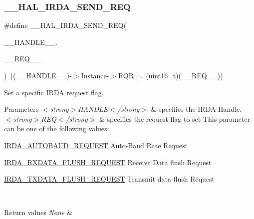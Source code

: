 \subsubsection{\texorpdfstring{\+\_\+\+\_\+\+H\+A\+L\+\_\+\+I\+R\+D\+A\+\_\+\+S\+E\+N\+D\+\_\+\+R\+EQ}{\_\_HAL\_IRDA\_SEND\_REQ}}
{\footnotesize\ttfamily \#define \+\_\+\+\_\+\+H\+A\+L\+\_\+\+I\+R\+D\+A\+\_\+\+S\+E\+N\+D\+\_\+\+R\+EQ(\begin{DoxyParamCaption}\item[{}]{\+\_\+\+\_\+\+H\+A\+N\+D\+L\+E\+\_\+\+\_\+,  }\item[{}]{\+\_\+\+\_\+\+R\+E\+Q\+\_\+\+\_\+ }\end{DoxyParamCaption})~((\+\_\+\+\_\+\+H\+A\+N\+D\+L\+E\+\_\+\+\_\+)-\/$>$Instance-\/$>$R\+QR $\vert$= (uint16\+\_\+t)(\+\_\+\+\_\+\+R\+E\+Q\+\_\+\+\_\+))}



Set a specific I\+R\+DA request flag. 


\begin{DoxyParams}{Parameters}
{\em $<$strong$>$\+H\+A\+N\+D\+L\+E$<$/strong$>$} & specifies the I\+R\+DA Handle. \\
\hline
{\em $<$strong$>$\+R\+E\+Q$<$/strong$>$} & specifies the request flag to set This parameter can be one of the following values\+: \begin{DoxyItemize}
\item \hyperlink{group___i_r_d_a___request___parameters_ga6431d33b8cf9df0d86e29a210df6d454}{I\+R\+D\+A\+\_\+\+A\+U\+T\+O\+B\+A\+U\+D\+\_\+\+R\+E\+Q\+U\+E\+ST} Auto-\/\+Baud Rate Request \item \hyperlink{group___i_r_d_a___request___parameters_gade40b479c4ee0227c2851e7eb3f0f930}{I\+R\+D\+A\+\_\+\+R\+X\+D\+A\+T\+A\+\_\+\+F\+L\+U\+S\+H\+\_\+\+R\+E\+Q\+U\+E\+ST} Receive Data flush Request \item \hyperlink{group___i_r_d_a___request___parameters_ga15f0617bb3c52ca8936f1d9127274ac9}{I\+R\+D\+A\+\_\+\+T\+X\+D\+A\+T\+A\+\_\+\+F\+L\+U\+S\+H\+\_\+\+R\+E\+Q\+U\+E\+ST} Transmit data flush Request\end{DoxyItemize}
\\
\hline
\end{DoxyParams}

\begin{DoxyRetVals}{Return values}
{\em None} & \\
\hline
\end{DoxyRetVals}
